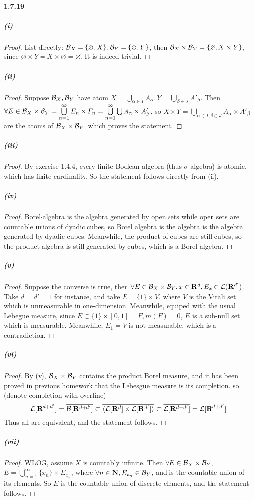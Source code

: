 \documentclass{article}
\begin{document}
\paragraph{1.7.19}
\subparagraph{(i)}
\begin{proof}
List directly: $\mathcal{B}_X=\{\varnothing,X\}, \mathcal{B}_Y=\{\varnothing, Y\}$, then $\mathcal{B}_X\times \mathcal{B}_Y=\{\varnothing, X\times Y\}$, since $\varnothing\times Y=X\times \varnothing=\varnothing$. It is indeed trivial.
\end{proof}
\subparagraph{(ii)}
\begin{proof}
Suppose $\mathcal{B}_X,\mathcal{B}_Y$ have atom $X=\bigcup\limits_{\alpha\in I}A_\alpha, Y=\bigcup\limits_{\beta\in J}A'_\beta$. Then $\forall E\in\mathcal{B}_X\times\mathcal{B}_Y=\bigcup\limits_{n=1}^{\infty} E_n\times F_n=\bigcup\limits_{n=1}^\infty \bigcup\limits A_\alpha\times A'_\beta$, so $X\times Y=\bigcup\limits_{\alpha\in I,\beta\in J}A_\alpha\times A'_\beta$ are the atoms of $\mathcal{B}_X\times \mathcal{B}_Y$, which proves the statement.
\end{proof}
\subparagraph{(iii)}
\begin{proof}
By exercise 1.4.4, every finite Boolean algebra (thus $\sigma$-algebra) is atomic, which has finite cardinality. So the statement follows directly from (ii).
\end{proof}
\subparagraph{(iv)}
\begin{proof}
Borel-algebra is the algebra generated by open sets while open sets are countable unions of dyadic cubes, so Borel algebra is the algebra is the algebra generated by dyadic cubes. Meanwhile, the product of cubes are still cubes, so  the product algebra is still generated by cubes, which is a Borel-algebra.
\end{proof}
\subparagraph{(v)}
\begin{proof}
Suppose the converse is true, then $\forall E\in \mathcal{B}_X\times \mathcal{B}_Y, x\in\mathbf{R}^d, E_x\in\mathcal{L}(\mathbf{R}^{d'})$. Take $d=d'=1$ for instance, and take $E=\{1\}\times V$, where $V$ is the Vitali set which is unmeasurable in one-dimension. Meanwhile, equiped with the usual Lebegue measure, since $E\subset \{1\}\times [0,1]=F,m(F)=0$, $E$ is a sub-null set which is measurable. Meanwhile, $E_1=V$ is not measurable, which is a contradiction.
\end{proof}
\newcommand{\Rd}{\mathbf{R}^{d+d'}}

\subparagraph{(vi)}
\begin{proof}
By (v), $\mathcal{B}_X\times\mathcal{B}_Y$ contains the product Borel measure, and it has been proved in previous homework that the Lebesgue measure is its completion. so (denote completion with overline)
\[\Leb[\Rd]=\overline{\B[\Rd]}\subset \overline{\left<\Leb[\mathbf{R}^d]\times\Leb[\mathbf{R}^{d'}]\right>}\subset\overline{\Leb[\Rd]}=\Leb[\Rd]\]
Thus all are equivalent, and the statement follows.
\end{proof}
\subparagraph{(vii)}
\begin{proof}
WLOG, assume $X$ is countably infinite. Then $\forall E\in\mathcal{B}_X\times\mathcal{B}_Y$, $E=\bigcup\limits_{n=1}^\infty \{x_n\}\times E_{x_n}$, where $\forall n\in\mathbf{N}, E_{x_n}\in\mathcal{B}_Y$, and is the countable union of its elements. So $E$ is the countable union of discrete elements, and the statement follows.
\end{proof}
\end{document}
